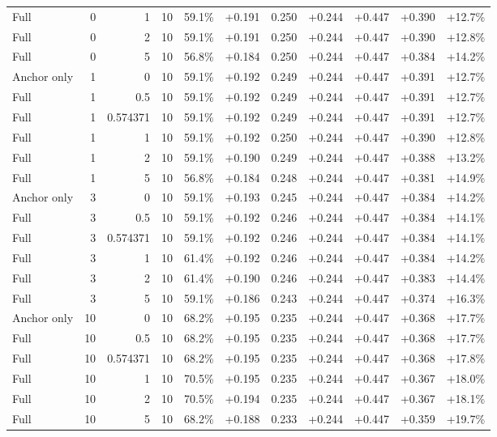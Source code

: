 \begin{table}[htbp]
\begin{tabular}{lrrrccccccc}
Full & 0 & 1 & 10 & 59.1\% & +0.191 & 0.250 & +0.244 & +0.447 & +0.390 & +12.7\% \\
Full & 0 & 2 & 10 & 59.1\% & +0.191 & 0.250 & +0.244 & +0.447 & +0.390 & +12.8\% \\
Full & 0 & 5 & 10 & 56.8\% & +0.184 & 0.250 & +0.244 & +0.447 & +0.384 & +14.2\% \\
Anchor only & 1 & 0 & 10 & 59.1\% & +0.192 & 0.249 & +0.244 & +0.447 & +0.391 & +12.7\% \\
Full & 1 & 0.5 & 10 & 59.1\% & +0.192 & 0.249 & +0.244 & +0.447 & +0.391 & +12.7\% \\
Full & 1 & 0.574371 & 10 & 59.1\% & +0.192 & 0.249 & +0.244 & +0.447 & +0.391 & +12.7\% \\
Full & 1 & 1 & 10 & 59.1\% & +0.192 & 0.250 & +0.244 & +0.447 & +0.390 & +12.8\% \\
Full & 1 & 2 & 10 & 59.1\% & +0.190 & 0.249 & +0.244 & +0.447 & +0.388 & +13.2\% \\
Full & 1 & 5 & 10 & 56.8\% & +0.184 & 0.248 & +0.244 & +0.447 & +0.381 & +14.9\% \\
Anchor only & 3 & 0 & 10 & 59.1\% & +0.193 & 0.245 & +0.244 & +0.447 & +0.384 & +14.2\% \\
Full & 3 & 0.5 & 10 & 59.1\% & +0.192 & 0.246 & +0.244 & +0.447 & +0.384 & +14.1\% \\
Full & 3 & 0.574371 & 10 & 59.1\% & +0.192 & 0.246 & +0.244 & +0.447 & +0.384 & +14.1\% \\
Full & 3 & 1 & 10 & 61.4\% & +0.192 & 0.246 & +0.244 & +0.447 & +0.384 & +14.2\% \\
Full & 3 & 2 & 10 & 61.4\% & +0.190 & 0.246 & +0.244 & +0.447 & +0.383 & +14.4\% \\
Full & 3 & 5 & 10 & 59.1\% & +0.186 & 0.243 & +0.244 & +0.447 & +0.374 & +16.3\% \\
Anchor only & 10 & 0 & 10 & 68.2\% & +0.195 & 0.235 & +0.244 & +0.447 & +0.368 & +17.7\% \\
Full & 10 & 0.5 & 10 & 68.2\% & +0.195 & 0.235 & +0.244 & +0.447 & +0.368 & +17.7\% \\
Full & 10 & 0.574371 & 10 & 68.2\% & +0.195 & 0.235 & +0.244 & +0.447 & +0.368 & +17.8\% \\
Full & 10 & 1 & 10 & 70.5\% & +0.195 & 0.235 & +0.244 & +0.447 & +0.367 & +18.0\% \\
Full & 10 & 2 & 10 & 70.5\% & +0.194 & 0.235 & +0.244 & +0.447 & +0.367 & +18.1\% \\
Full & 10 & 5 & 10 & 68.2\% & +0.188 & 0.233 & +0.244 & +0.447 & +0.359 & +19.7\% \\

\end{tabular}
\end{table}
